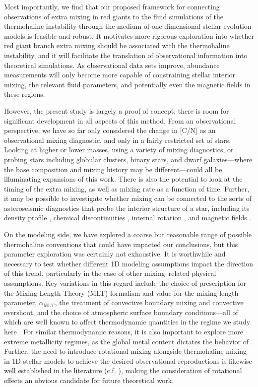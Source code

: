 Most importantly, we find that our proposed framework for connecting observations of extra mixing in red giants to the fluid simulations of the thermohaline instability through the medium of one dimensional stellar evolution models is feasible and robust. 
%
It motivates more rigorous exploration into whether red giant branch extra mixing should be associated with the thermohaline instability, and it will facilitate the translation of observational information into theoretical simulations. As observational data sets improve, abundance measurements will only become more capable of constraining stellar interior mixing, the relevant fluid parameters, and potentially even the magnetic fields in these regions.

However, the present study is largely a proof of concept;
there is room for significant development in all aspects of this method. From an observational perspective, we have so far only considered the change in [C/N] as an observational mixing diagnostic, and only in a fairly restricted set of stars. Looking at higher or lower masses, using a variety of mixing diagnostics, or probing stars including globular clusters, binary stars, and dwarf galaxies---where the base composition and mixing history may be different---could all be illuminating expansions of this work. There is also the potential to look at the timing of the extra mixing, as well as mixing rate as a function of time. Further, it may be possible to investigate whether mixing can be connected to the sorts of asteroseismic diagnostics that probe the interior structure of a star, including its density profile \citep{KjeldsenBedding1995}, chemical discontinuities \citep{Verma2017}, internal rotation \citep{Gehan2018}, and magnetic fields \citep{Bugnet2021}. 

On the modeling side, we have explored a coarse but reasonable range of possible thermohaline conventions that could have impacted our conclusions, but this parameter exploration was certainly not exhaustive. It is worthwhile and necessary to test whether different 1D modeling assumptions impact the direction of this trend, particularly in the case of other mixing--related physical assumptions. Key variations in this regard include the choice of prescription for the Mixing Length Theory (MLT) formalism and value for the mixing length parameter, $\alpha_{\text{MLT}}$, the treatment of convective boundary mixing and convective overshoot, and the choice of atmospheric surface boundary conditions---all of which are well known to affect thermodynamic quantities in the regime we study here \citep{tayar2017, Joyce2018a, Joyce2018b, viani2018}. For similar thermodynamic reasons, it is also important to explore more extreme metallicity regimes, as the global metal content dictates the behavior of \gradmu.
%
Further, the need to introduce rotational mixing alongside thermohaline mixing in 1D stellar models to achieve the desired observational reproductions is likewise well established in the literature (c.f. \citealt{Charbonnel2010}), making the consideration of rotational effects an obvious candidate for future theoretical work.

